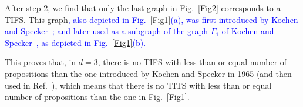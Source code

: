 \documentclass[%
  twocolumn,
 showpacs,
 showkeys,
 preprintnumbers,
 amsmath,amssymb,
 aps,
  pra,
  longbibliography,
 floatfix,
 ]{revtex4-1}
\newcommand{\karl}[1]{\textcolor{blue}{#1}}
\begin{document}
After step 2, we find that only the last graph in Fig.~\ref{Fig2} corresponds to a TIFS.
This graph\karl{, also depicted in Fig.~\ref{Fig1}(a),
was first introduced
by Kochen and Specker~\cite[Fig.~1, p.~182]{code2};
and later used as a subgraph of the graph
$\Gamma_1$ of Kochen and Specker~\cite{KS67}, as depicted in Fig.~\ref{Fig1}(b).}

This proves that, in $d=3$, there is no TIFS with less than or equal number of propositions than
the one introduced by Kochen and Specker in 1965 \cite[Fig.~1, p.~182]{code2}
(and then used in Ref.~\cite{code4}),
which means that there is no TITS with less than or equal number of propositions than the one in Fig.~\ref{Fig1}.


\end{document}

